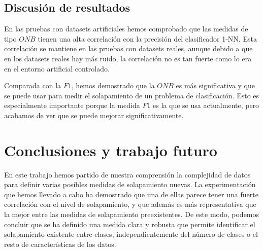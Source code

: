 \documentclass[a4paper,12pt]{report}
\theoremstyle{definition}
\begin{document}
\section{Discusión de resultados}
\label{sec:discusion}

En las pruebas con datasets artificiales hemos comprobado que las medidas de tipo $ONB$ tienen una alta correlación con la precisión del clasificador 1-NN. Esta correlación se mantiene en las pruebas con datasets reales, aunque debido a que en los datasets reales hay más ruido, la correlación no es tan fuerte como lo era en el entorno artificial controlado.

Comparada con la $F1$, hemos demostrado que la $ONB$ es más significativa y que se puede usar para medir el solapamiento de un problema de clasificación. Esto es especialmente importante porque la medida $F1$ es la que se usa actualmente, pero acabamos de ver que se puede mejorar significativamente.

\chapter{Conclusiones y trabajo futuro}
\label{chp:conclusion}

En este trabajo hemos partido de nuestra comprensión la complejidad de datos para definir varias posibles medidas de solapamiento nuevas. La experimentación que hemos llevado a cabo ha demostrado que una de ellas parece tener una fuerte correlación con el nivel de solapamiento, y que además es más representativa que la mejor entre las medidas de solapamiento preexistentes. De este modo, podemos concluir que se ha definido una medida clara y robusta que permite identificar el solapamiento existente entre clases, independientemente del número de clases o el resto de características de los datos.
\end{document}
